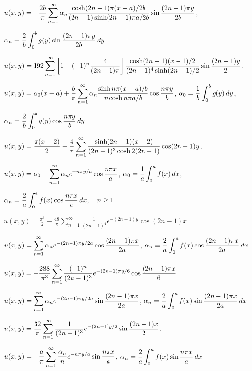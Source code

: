 $\displaystyle
u(x,y)=-\frac{2b}{\pi}\sum_{n=1}^{\infty}\alpha_{n}\frac{\cosh(2n-1)\pi(x-a)/2b}{(2n-1)\sinh(2n-1)\pi a/2b}
\sin\frac{(2n-1)\pi y}{2b}$,\quad

\quad \quad$\displaystyle\alpha_{n}=\frac{2}{b}\int_{0}^{b}g(y)\sin
\frac{(2n-1)\pi y}{2b}\,dy$

\quad \quad$u(x,y)=\displaystyle192\sum_{n=1}^{\infty}
\left[1+(-1)^{n}\frac{4}{(2n-1)\pi}\right]
{\frac{\cosh(2n-1)(x-1)/2}{(2n-1)^{4}\sinh(2n-1)/2}}
\sin\frac{(2n-1)y}{2}$.

$\displaystyle
u(x,y)=\alpha_{0}(x-a)+\frac{b}{\pi}\sum_{n=1}^{\infty}\alpha_{n}\frac{\sinh
n\pi(x-a)/b}{n\cosh n\pi a/b}
\cos\frac{n\pi y}{b}$,\quad
$\displaystyle\alpha_{0}=\frac{1}{b}\int_{0}^{b}g(y)\,dy$,

\quad \quad$\displaystyle\alpha_{n}=\frac{2}{b}\int_{0}^{b}g(y)\cos
\frac{n\pi y}{b}\,dy$

\quad \quad$u(x,y)=\displaystyle\frac{\pi(x-2)}{2}-\frac{4}{\pi}\sum_{n=1}^{\infty}
\frac{\sinh(2n-1)(x-2)}{(2n-1)^{3}\cosh2(2n-1)}
\cos(2n-1)y$.

$u(x,y)=\displaystyle\alpha_{0}+\sum_{n=1}^{\infty}\alpha_{n}e^{-n\pi y/a}\cos
\frac{n\pi x}{a}$,\quad
$\alpha_{0}=\displaystyle\frac{1}{a}\int_{0}^{a}f(x)\,dx$,

\quad \quad$\alpha_{n}=\displaystyle\frac{2}{a}\int_{0}^{a}f(x)\cos
\frac{n\pi x}{a}\,dx,\quad n\ge1$

\quad \quad$u(x,y)=\frac{\pi^{3}}{2}-\frac{48}{\pi}\sum_{n=1}^{\infty}\frac{1}{(2n-1)^{4}}e^{-(2n-1)y}\cos(2n-1)x$

$u(x,y)=\displaystyle\sum_{n=1}^{\infty}\alpha_{n}e^{-(2n-1)\pi y/2a}\cos
\frac{(2n-1)\pi x}{2a}$,\quad
$\alpha_{n}=\displaystyle\frac{2}{a}\int_{0}^{a}
f(x)\cos\frac{(2n-1)\pi x}{2a}\,dx$

\quad \quad$u(x,y)=-\displaystyle
\frac{288}{\pi^{3}}\sum_{n=1}^{\infty}\frac{(-1)^{n}}{(2n-1)^{3}}e^{-(2n-1)\pi y/6}\cos\frac{(2n-1)\pi x}{6}$

$u(x,y)=\displaystyle\sum_{n=1}^{\infty}\alpha_{n}e^{-(2n-1)\pi y/2a}\sin
\frac{(2n-1)\pi x}{2a}$,\quad
$\alpha_{n}=\displaystyle\frac{2}{a}\int_{0}^{a}
f(x)\sin\frac{(2n-1)\pi x}{2a}\,dx$

\quad \quad$u(x,y)=\displaystyle
\frac{32}{\pi}\sum_{n=1}^{\infty}\frac{1}{(2n-1)^{3}}e^{-(2n-1)y/2}\sin\frac{(2n-1)x}{2}$.

$u(x,y)=-\displaystyle\frac{a}{\pi}\sum_{n=1}^{\infty}\frac{\alpha_{n}}{n}e^{-n\pi
y/a}\sin
\frac{n\pi x}{a}$, \quad
$\alpha_{n}=\displaystyle\frac{2}{a}\int_{0}^{a}
f(x)\sin\frac{n\pi x}{a}\,dx$

